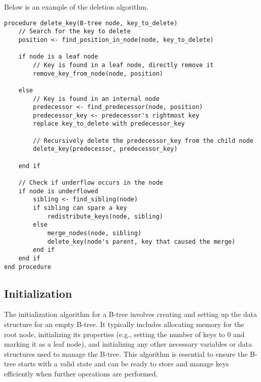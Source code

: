 \begin{highlight}

Below is an example of the deletion algorithm.

\horizontalline

\begin{verbatim}
procedure delete_key(B-tree node, key_to_delete)
    // Search for the key to delete
    position <- find_position_in_node(node, key_to_delete)

    if node is a leaf node
        // Key is found in a leaf node, directly remove it
        remove_key_from_node(node, position)

    else
        // Key is found in an internal node
        predecessor <- find_predecessor(node, position)
        predecessor_key <- predecessor's rightmost key
        replace key_to_delete with predecessor_key

        // Recursively delete the predecessor_key from the child node
        delete_key(predecessor, predecessor_key)

    end if

    // Check if underflow occurs in the node
    if node is underflowed
        sibling <- find_sibling(node)
        if sibling can spare a key
            redistribute_keys(node, sibling)
        else
            merge_nodes(node, sibling)
            delete_key(node's parent, key that caused the merge)
        end if
    end if
end procedure
\end{verbatim}

\end{highlight}

\subsection*{Initialization}

The initialization algorithm for a B-tree involves creating and setting up the data structure for an empty B-tree. It typically includes allocating memory for the root node, initializing its properties 
(e.g., setting the number of keys to 0 and marking it as a leaf node), and initializing any other necessary variables or data structures used to manage the B-tree. This algorithm is essential to ensure 
the B-tree starts with a valid state and can be ready to store and manage keys efficiently when further operations are performed.

